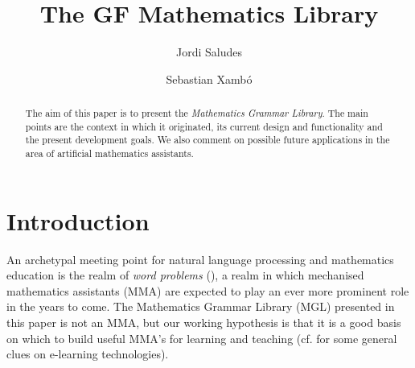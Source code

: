\documentclass[submission,copyright,creativecommons]{eptcs}
\title{The GF Mathematics Library}
\author{Jordi Saludes
\institute{Universitat Polit\`ecnica de Catalunya}
\institute{Sistemes Avan\c cats de Control}
\email{jordi.saludes@upc.edu}
\and
Sebastian Xamb\'o
\institute{Universitat Polit\`ecnica de Catalunya}
\institute{MA2, Edifici OMEGA, Barcelona (Spain)}
\email{\quad sebastia.xambo@upc.edu}
}
\begin{document}
\maketitle



\newcommand{\molto}{\textsc{mOlto}}
\newcommand{\webalt}{\textsc{WebALT}}
\newcommand{\openmath}{\textsc{OpenMath}}
\newcommand{\CD}{\textsc{CD}}
\newcommand{\OM}{\textsc{OM}}
\newcommand{\MGL}{\textsc{MGL}}
\newcommand{\MMA}{\textsc{MMA}}
\newcommand{\CAS}{\textsc{CAS}}
\newcommand{\GF}{\textsc{GF}}

\newcommand{\Nat}{\texttt{Nat}}
\newcommand{\Prop}{\texttt{Prop}}

\newcommand{\exclude}[1]{}


\begin{abstract}
The aim of this paper is to present
the \emph{Mathematics Grammar Library}.
The main points are
the context in which it originated,
its current design and functionality
and the present development goals.
We also comment on possible future applications
in the area of artificial mathematics assistants.
\end{abstract}



\exclude{
Bib so far:
\cite{Caprotti_multilingualdelivery},
\cite{Caprotti06webalt!deliver},
\cite{Nganga06},
\cite{Caprotti05},
\cite{Strotmann05},
\cite{Strotmann05!ISAAC},
\cite{Carlson05},
\cite{OpenMath},
\cite{GF},
\cite{Mathbar},
\cite{E-LearningMathematics},
\cite{AutonomousLearners}
}




\section{Introduction}

An archetypal meeting point for natural language processing and mathematics
education is the realm of \emph{word problems}
(\cite{wikipedia-wordproblem, Verschaffel-Greer-DeCorte-2000}), a realm in
which mechanised mathematics assistants (\MMA) are expected to play an ever
more prominent role in the years to come.  The Mathematics Grammar Library
(\MGL) presented in this paper is not an \MMA, but our working hypothesis
is that it is a good basis on which to build useful \MMA's for learning and
teaching (cf. \cite{E-LearningMathematics, AutonomousLearners} for some
general clues on e-learning technologies).
\end{document}
